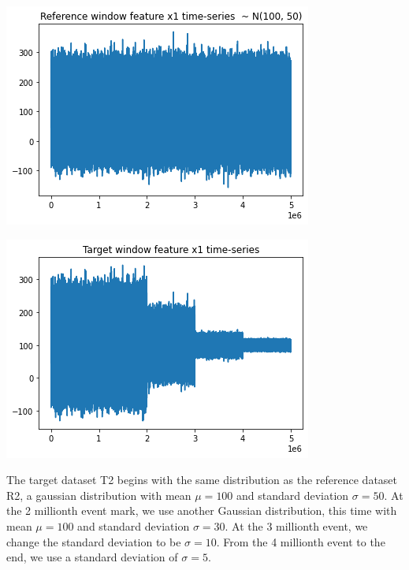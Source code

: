 \begin{center}
\begin{minipage}{.5\textwidth}
  \centering
  \includegraphics[width=1\linewidth]{figures/timeseries-r2.png}
  \label{fig:timeseries-r2}
\end{minipage}%
\begin{minipage}{.5\textwidth}
  \centering
  \includegraphics[width=1\linewidth]{figures/timeseries-t2.png}
  \label{fig:timeseries-t2}
\end{minipage}
\end{center}

The target dataset T2 begins with the same distribution as the reference dataset R2, a gaussian distribution with mean $\mu=100$ and standard deviation $\sigma=50$. At the 2 millionth event mark, we use another Gaussian distribution, this time with mean $\mu=100$ and standard deviation $\sigma=30$. At the 3 millionth event, we change the standard deviation to be $\sigma=10$. From the 4 millionth event to the end, we use a standard deviation of $\sigma=5$. 

